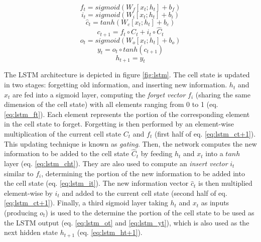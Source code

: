 \begin{equation}
   f_t = sigmoid(W_f[x_t;h_t] + b_f) 
   \label{eq:lstm_ft}
\end{equation}
\begin{equation}
   i_t = sigmoid(W_i[x_t;h_t] + b_i)
   \label{eq:lstm_it}
\end{equation}
\begin{equation}
   \hat{c}_t = tanh(W_c[x_t;h_t] + b_c)
   \label{eq:lstm_cht}
\end{equation}
\begin{equation}
   c_{t + 1} = f_t \circ C_t + i_t \circ \hat{C}_t
   \label{eq:lstm_ct+1}
\end{equation}
\begin{equation}
   o_t = sigmoid(W_o[x_t;h_t] + b_o)
   \label{eq:lstm_ot}
\end{equation}
\begin{equation}
   y_t = o_t \circ tanh(c_{t + 1})
   \label{eq:lstm_yt}
\end{equation}
\begin{equation}
   h_{t + 1} = y_t
   \label{eq:lstm_ht+1}
\end{equation}

The LSTM architecture is depicted in figure \ref{fig:lstm}. The cell state is updated in two stages: forgetting old information, and inserting new information. $h_t$ and $x_t$ are fed into a sigmoid layer, computing the \emph{forget vector} $f_i$ (sharing the same dimension of the cell state) with all elements ranging from 0 to 1 (eq. \ref{eq:lstm_ft}). Each element represents the portion of the corresponding element in the cell state to forget. Forgetting is then performed by an element-wise multiplication of the current cell state $C_t$ and $f_t$ (first half of eq. \ref{eq:lstm_ct+1}). This updating technique is known as \emph{gating}. 
Then, the network computes the new information to be added to the cell state $\hat{C}_t$ by feeding $h_t$ and $x_t$ into a $tanh$ layer (eq. \ref{eq:lstm_cht}). They are also used to compute an \emph{insert vector} $i_t$ similar to $f_i$, determining the portion of the new information to be added into the cell state (eq. \ref{eq:lstm_it}). The new information vector $\hat{c}_t$ is then multiplied element-wise by $i_t$ and added to the current cell state (second half of eq. \ref{eq:lstm_ct+1}).
Finally, a third sigmoid layer taking $h_t$ and $x_t$ as inputs (producing $o_t$) is used to the determine the portion of the cell state to be used as the LSTM output (eq. \ref{eq:lstm_ot} and \ref{eq:lstm_yt}), which is also used as the next hidden state $h_{t+1}$ (eq. \ref{eq:lstm_ht+1}). 

